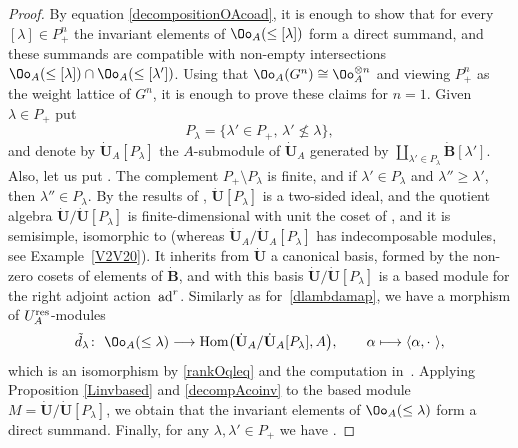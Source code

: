 \begin{proof} By equation \eqref{decompositionOAcoad}, it is enough to show that for every $[\lambda]\in P_+^n$ the invariant elements of $\Oo_A(\leq [\lambda])$ form a direct summand, and these summands are compatible with non-empty intersections $\Oo_A(\leq [\lambda]) \cap \Oo_A(\leq [\lambda'])$. Using that $\Oo_A(G^n) \cong \Oo_A^{\otimes n}$ and viewing $P_+^n$ as the weight lattice of $G^n$, it is enough to prove these claims for $n=1$. Given $\lambda\in P_+$ put
\[P_{\lambda} = \{\lambda'\in P_+, \, \lambda' \nleqslant \lambda\},\]
and denote by $\dot{\mathbf{U}}_A [P_\lambda]$ the $A$-submodule of $\dot{\mathbf{U}}_A$ generated by $\coprod_{\lambda' \in P_\lambda} \dot{\mathbf{B}} [\lambda']$. Also, let us put .
The complement $P_+\setminus P_{\lambda}$ is finite, and if $\lambda'\in P_{\lambda}$ and $\lambda''\geq \lambda'$, then $\lambda''\in P_{\lambda}$. By the results of \cite[Section~29.2]{Lusztig}, $ \dot{\mathbf{U}} [P_\lambda]$ is a two-sided ideal, and the quotient algebra $\dot{\mathbf{U}} / \dot{\mathbf{U}} [P_\lambda]$ is finite-dimensional with unit the coset of , and it is semisimple, isomorphic to  (whereas $\dot{\mathbf{U}}_A / \dot{\mathbf{U}}_A [P_\lambda]$ has indecomposable modules, see Example~\ref{V2V20}).
It inherits from $\dot{\mathbf{U}}$ a canonical basis, formed by the non-zero cosets of elements of $\dot{\mathbf{B}}$, and with this basis $\dot{\mathbf{U}} / \dot{\mathbf{U}} [P_\lambda]$ is a based module for the right adjoint action~${\rm ad}^r$. Similarly as for~\eqref{dlambdamap}, we have a morphism of $U_A^{\rm res}$-modules
\[
\tilde{d}_\lambda\colon\ \Oo_A(\leq \lambda)\longrightarrow {\rm Hom} \big( \dot{\mathbf{U}}_A / \dot{\mathbf{U}}_A [P_\lambda],A\big),\qquad \alpha\longmapsto\langle \alpha , \cdot \ \rangle,\]
which is an isomorphism by \eqref{rankOqleq} and the computation  in~\cite[Section~29.2]{Lusztig}. Applying Proposition \ref{Linvbased} and \eqref{decompAcoinv} to the based module ${M=\dot{\mathbf{U}} / \dot{\mathbf{U}} [P_\lambda]}$, we obtain that the invariant elements of $\Oo_A(\leq \lambda)$ form a direct summand. Finally, for any ${\lambda,\lambda'\!\in\! P_+}$ we have .

\end{proof}
